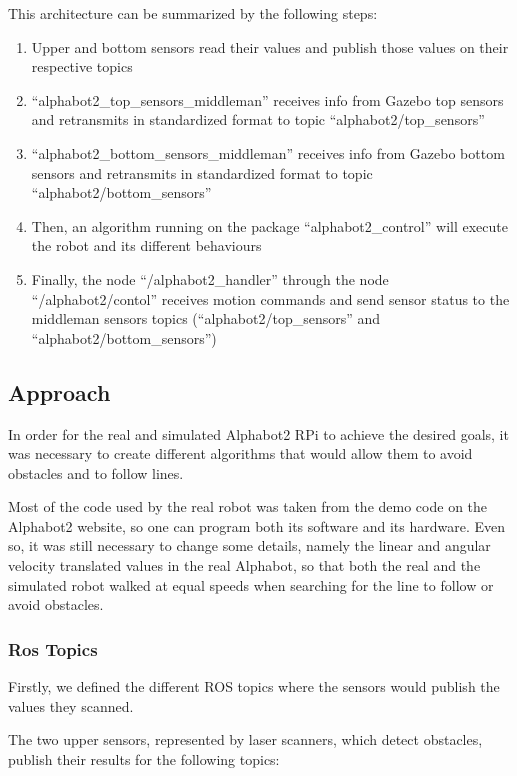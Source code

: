 \documentclass[conference]{IEEEtran}
\begin{document}
This architecture can be summarized by the following steps:

\begin{enumerate}
    \item Upper and bottom sensors read their values and publish those values on their respective topics
    \item ``alphabot2\_top\_sensors\_middleman'' receives info from Gazebo top sensors and retransmits in standardized format to topic ``alphabot2/top\_sensors''
    \item ``alphabot2\_bottom\_sensors\_middleman'' receives info from Gazebo bottom sensors and retransmits in standardized format to topic ``alphabot2/bottom\_sensors''
    \item Then, an algorithm running on the package ``alphabot2\_control'' will execute the robot and its different behaviours
    \item Finally, the node ``/alphabot2\_handler'' through the node ``/alphabot2/contol'' receives motion commands and send sensor status to the middleman sensors topics (``alphabot2/top\_sensors'' and ``alphabot2/bottom\_sensors'')
\end{enumerate}

\subsection{Approach} \label{alg}

In order for the real and simulated Alphabot2 RPi to achieve the desired goals, it was necessary to create different algorithms that would allow them to avoid obstacles and to follow lines.

Most of the code used by the real robot was taken from the demo code on the Alphabot2 website, so one can program both its software and its hardware. Even so, it was still necessary to change some details, namely the linear and angular velocity translated values in the real Alphabot, so that both the real and the simulated robot walked at equal speeds when searching for the line to follow or avoid obstacles.

\subsubsection{Ros Topics} \label{topics}

Firstly, we defined the different ROS topics where the sensors would publish the values they scanned.

The two upper sensors, represented by laser scanners, which detect obstacles, publish their results for the following topics:
\end{document}
